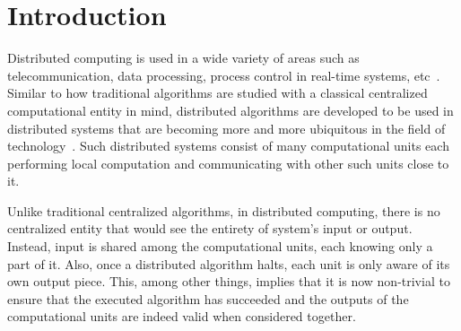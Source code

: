 \chapter{Introduction}
\label{chapter:intro}

Distributed computing is used in a wide variety of areas
such as telecommunication, data processing, process control in real-time systems, etc~\cite{Lynch1996}. Similar to
how traditional algorithms are studied with a classical
centralized computational entity in mind, distributed
algorithms are developed to be used in distributed
systems that are becoming more and more ubiquitous in the
field of technology~\cite{Attiya2004}. Such distributed
systems consist of many computational units each
performing local computation and communicating
with other such units close to it.

Unlike traditional
centralized algorithms, in distributed computing,
there is no centralized entity that would see the
entirety of system's input or output. Instead,
input is shared among the computational units, each
knowing only a part of it. Also, once a distributed
algorithm halts, each unit is only aware of its
own output piece. This, among other things, implies
that it is now non-trivial to ensure that the
executed algorithm has succeeded and the
outputs of the computational units are
indeed valid when considered together.

